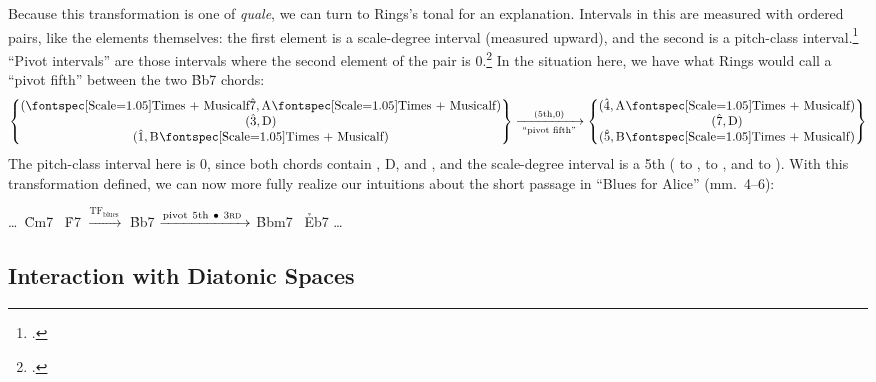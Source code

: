 Because this transformation is one of \emph{quale}, we can turn to Rings's
tonal \gis for an explanation. Intervals in this \gis are measured with
ordered pairs, like the elements themselves: the first element is a
scale-degree interval (measured upward), and the second is a pitch-class
interval.\footcite[46--48]{rings:2011} ``Pivot intervals'' are those intervals
where the second element of the pair is $0$.\footcite[58--66]{rings:2011} In
the situation here, we have what Rings would call a ``pivot fifth'' between
the two \h{Bb7} chords:
%
\begin{displaymath}
  \setlength{\arraycolsep}{3em}
    \begin{Bmatrix}
      (\text{\flat\sd7}, \text{\Aflat}) \\
      (\text{\sd3},      \text{D}) \\
      (\text{\sd1},      \text{\Bflat})
    \end{Bmatrix}
    \xrightarrow[\text{ ``pivot fifth'' }]{(5\mathrm{th}, 0)}
    \begin{Bmatrix}
      (\text{\sd4}, \text{\Aflat}) \\
      (\text{\sd7}, \text{D}) \\
      (\text{\sd5}, \text{\Bflat})
    \end{Bmatrix}
\end{displaymath}
%
The pitch-class interval here is 0, since both chords contain \Bflat, D, and
\Aflat, and the scale-degree interval is a 5th ( to ,  to , and
\flat{} to ). With this transformation defined, we can now more fully
realize our intuitions about the short passage in ``Blues for Alice'' (mm.~4--6):
\begin{center}
  \ldots\ \h{Cm7} \TFarrow\ \h{F7} $\xrightarrow{\mathrm{TF}_{\mathrm{blues}}\ }$
  \h{Bb7} $\xrightarrow{\mathrm{ pivot\ 5th}\ \bullet\ 3\text{\textsc{rd} }}$
  \h{Bbm7} \TFarrow\ \h{Eb7} \ldots
\end{center}


\subsection{Interaction with Diatonic Spaces}

